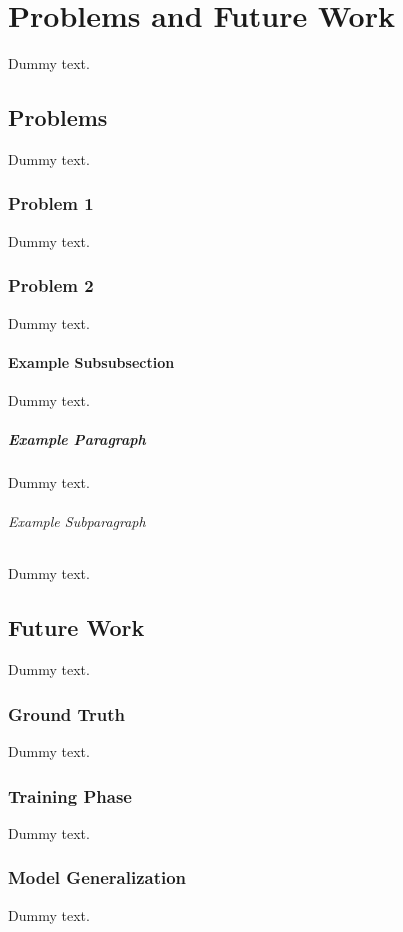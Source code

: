 \chapter{Problems and Future Work}

Dummy text.

\section{Problems}

Dummy text.

\subsection{Problem 1}

Dummy text.

\subsection{Problem 2}

Dummy text.

\subsubsection{Example Subsubsection}

Dummy text.

\paragraph{Example Paragraph}

Dummy text.

\subparagraph{Example Subparagraph}

Dummy text.

\section{Future Work}

Dummy text.

\subsection{Ground Truth}

Dummy text.

\subsection{Training Phase}

Dummy text.

\subsection{Model Generalization}

Dummy text.
